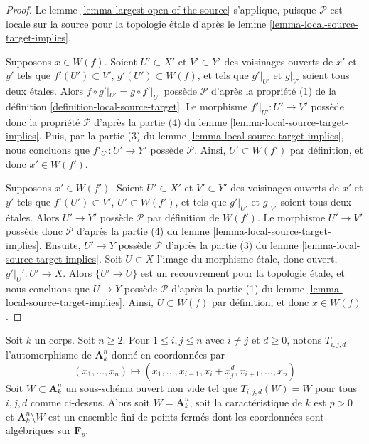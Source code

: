 \begin{proof}
Le lemme \ref{lemma-largest-open-of-the-source} s'applique, puisque
$\mathcal{P}$ est locale sur la source pour la topologie \'etale d'après le
lemme \ref{lemma-local-source-target-implies}.

\medskip\noindent
Supposons $x \in W(f)$. Soient $U' \subset X'$ et $V' \subset Y'$ des
voisinages ouverts de $x'$ et $y'$ tels que $f'(U') \subset V'$,
$g'(U') \subset W(f)$, et tels que $g'|_{U'}$ et $g|_{V'}$ soient tous deux
étales.
Alors $f \circ g'|_{U'} = g \circ f'|_{U'}$ possède $\mathcal{P}$ d'après la
propriété (1) de la définition \ref{definition-local-source-target}.
Le morphisme $f'|_{U'} : U' \to V'$ possède donc la propriété $\mathcal{P}$
d'après la partie (4) du lemme \ref{lemma-local-source-target-implies}.
Puis, par la partie (3) du lemme \ref{lemma-local-source-target-implies}, nous
concluons que $f'_{U'} : U' \to Y'$ possède $\mathcal{P}$.
Ainsi, $U' \subset W(f')$ par définition, et donc $x' \in W(f')$.

\medskip\noindent
Supposons $x' \in W(f')$. Soient $U' \subset X'$ et $V' \subset Y'$ des
voisinages ouverts de $x'$ et $y'$ tels que $f'(U') \subset V'$,
$U' \subset W(f')$, et tels que $g'|_{U'}$ et $g|_{V'}$ soient tous deux
étales.
Alors $U' \to Y'$ possède $\mathcal{P}$ par définition de $W(f')$.
Le morphisme $U' \to V'$ possède donc $\mathcal{P}$ d'après la partie (4) du
lemme \ref{lemma-local-source-target-implies}.
Ensuite, $U' \to Y$ possède $\mathcal{P}$ d'après la partie (3) du
lemme \ref{lemma-local-source-target-implies}.
Soit $U \subset X$ l'image du morphisme \'etale, donc ouvert,
$g'|_U' : U' \to X$. Alors $\{U' \to U\}$ est un recouvrement pour la
topologie \'etale, et
nous concluons que $U \to Y$ possède $\mathcal{P}$ d'après la partie (1) du
lemme \ref{lemma-local-source-target-implies}.
Ainsi, $U \subset W(f)$ par définition, et donc $x \in W(f)$.
\end{proof}

\begin{lemma}
\label{lemma-orbits}
Soit $k$ un corps. Soit $n \geq 2$. Pour $1 \leq i, j \leq n$ avec
$i \not = j$ et $d \geq 0$, notons $T_{i, j, d}$ l'automorphisme de
$\mathbf{A}^n_k$ donné en coordonnées par
$$
(x_1, \ldots, x_n) \longmapsto
(x_1, \ldots, x_{i - 1}, x_i + x_j^d, x_{i + 1}, \ldots, x_n)
$$
Soit $W \subset \mathbf{A}^n_k$ un sous-schéma ouvert non vide tel que
$T_{i, j, d}(W) = W$ pour tous $i, j, d$ comme ci-dessus. Alors soit
$W = \mathbf{A}^n_k$, soit la caractéristique de $k$ est $p > 0$ et
$\mathbf{A}^n_k \setminus W$ est un ensemble fini de points fermés dont les
coordonnées sont algébriques sur $\mathbf{F}_p$.
\end{lemma}

